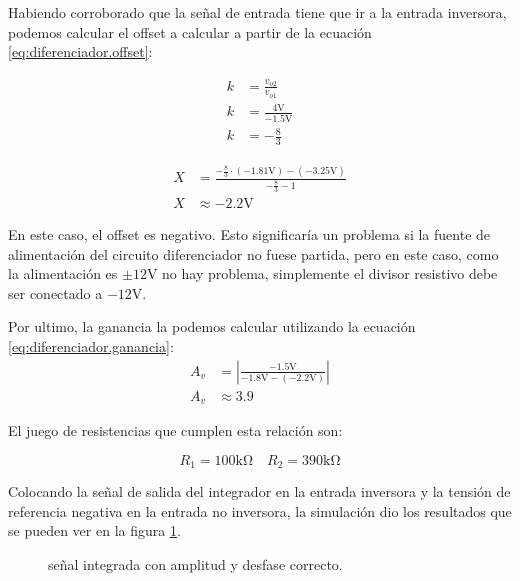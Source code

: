 Habiendo corroborado que la señal de entrada tiene que ir a la entrada inversora, podemos calcular el offset a calcular
a partir de la ecuación \ref{eq:diferenciador.offset}:
\begin{figure}[!ht]
  \centering
  \begin{subfigure}[t]{0.45\textwidth}
    \begin{align*}
      k &= \frac{v_{o2}}{v_{o1}} \\
      k &= \frac{4 \si{\volt}}{-1.5 \si{\volt}} \\
      k &= -\frac{8}{3}
    \end{align*}
  \end{subfigure}
  \hspace{.5cm}
  \begin{subfigure}[t]{0.45\textwidth}
    \begin{align*}
      X &= \frac{-\frac{8}{3} \cdot (-1.81 \si{\volt}) - (-3.25 \si{\volt})}{-\frac{8}{3} - 1} \\
      X &\approx -2.2 \si{\volt}
    \end{align*}
  \end{subfigure}
\end{figure}

En este caso, el offset es negativo. Esto significaría un problema si la fuente de alimentación del circuito
diferenciador no fuese partida, pero en este caso, como la alimentación es $\pm 12 \si{\volt}$ no hay problema, simplemente el
divisor resistivo debe ser conectado a $-12 \si{\volt}$.

Por ultimo, la ganancia la podemos calcular utilizando la ecuación \ref{eq:diferenciador.ganancia}:
\begin{align*}
  A_v &= \left| \frac{-1.5 \si{\volt}}{-1.8 \si{\volt} - (-2.2 \si{\volt})} \right| \\
  A_v &\approx 3.9
\end{align*}

El juego de resistencias que cumplen esta relación son:

\begin{equation*}
  R_1 = 100 \si{\kilo \ohm} \quad R_2 = 390 \si{\kilo \ohm}
\end{equation*}

Colocando la señal de salida del integrador en la entrada inversora y la tensión de referencia negativa en la entrada no
inversora, la simulación dio los resultados que se pueden ver en la figura \ref{plot:integrador}.

\begin{figure}[!ht]
  \centering
  
  \caption{señal integrada con amplitud y desfase correcto.}
  \label{plot:integrador}
\end{figure}

